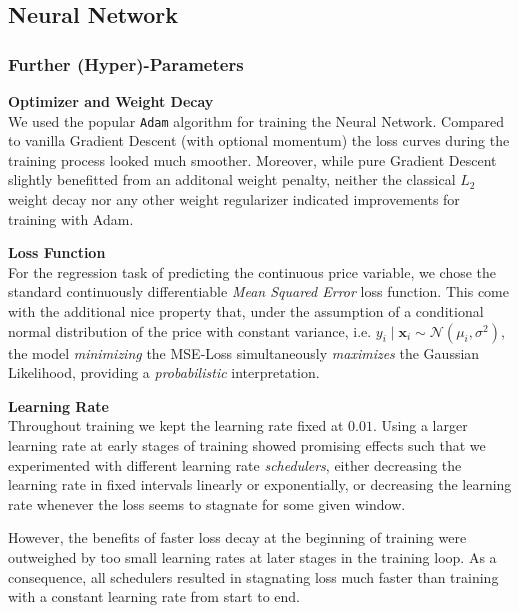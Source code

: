 \documentclass[12pt, letterpaper]{article}
\begin{document}
\begin{appendices}
    \section{}
    \subsection{Neural Network}

    \subsubsection{Further (Hyper)-Parameters} \label{appendix:hyperparameters}

    \textbf{Optimizer and Weight Decay} \\
    We used the popular \texttt{Adam} algorithm \cite{kingma2017} for training the Neural Network.
    Compared to vanilla Gradient Descent (with optional momentum) the loss curves during the training process looked much smoother.
    Moreover, while pure Gradient Descent slightly benefitted from an additonal weight penalty, neither the classical $L_2$ weight decay nor any other weight regularizer indicated improvements for training with Adam.

    \textbf{Loss Function} \\
    For the regression task of predicting the continuous price variable, we chose the standard continuously differentiable \emph{Mean Squared Error} loss function.
    This come with the additional nice property that, under the assumption of a conditional normal distribution of the price with constant variance, i.e. $y_i \mid \mathbf{x}_i \sim \mathcal{N} \left(\mu_i, \sigma^2 \right)$, the model \emph{minimizing} the MSE-Loss simultaneously \emph{maximizes} the Gaussian Likelihood, providing a \emph{probabilistic} interpretation.

    \textbf{Learning Rate} \\
    Throughout training we kept the learning rate fixed at $0.01$.
    Using a larger learning rate at early stages of training showed promising effects such that we experimented with different learning rate \emph{schedulers}, either decreasing the learning rate in fixed intervals linearly or exponentially, or decreasing the learning rate whenever the loss seems to stagnate for some given window.

    However, the benefits of faster loss decay at the beginning of training were outweighed by too small learning rates at later stages in the training loop.
    As a consequence, all schedulers resulted in stagnating loss much faster than training with a constant learning rate from start to end.


\end{appendices}
\end{document}
